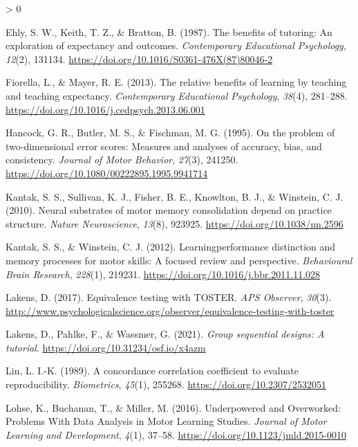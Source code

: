 \documentclass[
  english,
  man,floatsintext]{apa7}
\newlength{\cslhangindent}
\newenvironment{CSLReferences}[2] %
 {%
  \setlength{\parindent}{0pt}
  \ifodd #1 \everypar{\setlength{\hangindent}{\cslhangindent}}\ignorespaces\fi
  \ifnum #2 > 0
  \setlength{\parskip}{#2\baselineskip}
  \fi
 }%
 {}
\begin{document}
\begin{CSLReferences}{1}{0}
\leavevmode\hypertarget{ref-ehly1987}{}%
Ehly, S. W., Keith, T. Z., \& Bratton, B. (1987). The benefits of tutoring: An exploration of expectancy and outcomes. \emph{Contemporary Educational Psychology}, \emph{12}(2), 131134. \url{https://doi.org/10.1016/S0361-476X(87)80046-2}

\leavevmode\hypertarget{ref-fiorella2013}{}%
Fiorella, L., \& Mayer, R. E. (2013). The relative benefits of learning by teaching and teaching expectancy. \emph{Contemporary Educational Psychology}, \emph{38}(4), 281--288. \url{https://doi.org/10.1016/j.cedpsych.2013.06.001}

\leavevmode\hypertarget{ref-hancock1995}{}%
Hancock, G. R., Butler, M. S., \& Fischman, M. G. (1995). On the problem of two-dimensional error scores: Measures and analyses of accuracy, bias, and consistency. \emph{Journal of Motor Behavior}, \emph{27}(3), 241250. \url{https://doi.org/10.1080/00222895.1995.9941714}

\leavevmode\hypertarget{ref-kantak2010}{}%
Kantak, S. S., Sullivan, K. J., Fisher, B. E., Knowlton, B. J., \& Winstein, C. J. (2010). Neural substrates of motor memory consolidation depend on practice structure. \emph{Nature Neuroscience}, \emph{13}(8), 923925. \url{https://doi.org/10.1038/nn.2596}

\leavevmode\hypertarget{ref-kantak2012}{}%
Kantak, S. S., \& Winstein, C. J. (2012). Learning{{}}performance distinction and memory processes for motor skills: A focused review and perspective. \emph{Behavioural Brain Research}, \emph{228}(1), 219231. \url{https://doi.org/10.1016/j.bbr.2011.11.028}

\leavevmode\hypertarget{ref-lakens2017}{}%
Lakens, D. (2017). Equivalence testing with TOSTER. \emph{APS Observer}, \emph{30}(3). \url{http://www.psychologicalscience.org/observer/equivalence-testing-with-toster}

\leavevmode\hypertarget{ref-lakens2021}{}%
Lakens, D., Pahlke, F., \& Wassmer, G. (2021). \emph{Group sequential designs: A tutorial}. \url{https://doi.org/10.31234/osf.io/x4azm}

\leavevmode\hypertarget{ref-lin1989}{}%
Lin, L. I.-K. (1989). A concordance correlation coefficient to evaluate reproducibility. \emph{Biometrics}, \emph{45}(1), 255268. \url{https://doi.org/10.2307/2532051}

\leavevmode\hypertarget{ref-lohse2016}{}%
Lohse, K., Buchanan, T., \& Miller, M. (2016). Underpowered and Overworked: Problems With Data Analysis in Motor Learning Studies. \emph{Journal of Motor Learning and Development}, \emph{4}(1), 37--58. \url{https://doi.org/10.1123/jmld.2015-0010}


\end{CSLReferences}
\end{document}
